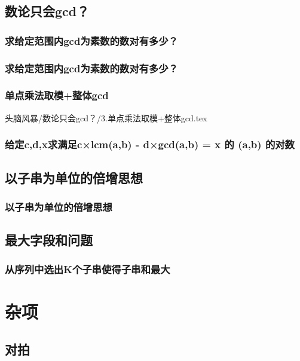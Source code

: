 \documentclass[10pt,a4paper]{article}
\begin{document}
	\subsection{数论只会gcd？}
	\subsubsection{求给定范围内gcd为素数的数对有多少？}
	
	\subsubsection{求给定范围内gcd为素数的数对有多少？}
	
	\subsubsection{单点乘法取模+整体gcd}
	{头脑风暴/数论只会gcd？/3.单点乘法取模+整体gcd.tex}
	\subsubsection{给定c,d,x求满足c×lcm(a,b) - d×gcd(a,b) = x 的 (a,b) 的对数}
	
	\subsection{以子串为单位的倍增思想}
	\subsubsection{以子串为单位的倍增思想}
	
	\subsection{最大字段和问题}
	\subsubsection{从序列中选出K个子串使得子串和最大}
	
	\section{杂项}
	\subsection{对拍}
\end{document}
